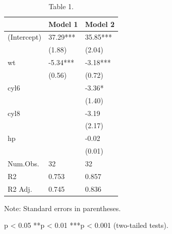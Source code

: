 \begin{table}[!t]
\centering
\caption{Table 1.}
\begin{threeparttable}
\begin{tabular}{lll}
\toprule
\rowcolor[gray]{0.92}
& Model 1 & Model 2 \\ \midrule
(Intercept) & 37.29*** & 35.85*** \\
& (1.88) & (2.04) \\
wt & -5.34*** & -3.18*** \\
& (0.56) & (0.72) \\
cyl6 &  & -3.36* \\
&  & (1.40) \\
cyl8 &  & -3.19 \\
&  & (2.17) \\
hp &  & -0.02 \\
&  & (0.01) \\
Num.Obs. & 32 & 32 \\
R2 & 0.753 & 0.857 \\
R2 Adj. & 0.745 & 0.836 \\
\bottomrule
\end{tabular}
\begin{tablenotes}[flushleft]\footnotesize
\item Note: Standard errors in parentheses.
\item *p < 0.05  **p < 0.01  ***p < 0.001 (two-tailed tests).
\end{tablenotes}
\end{threeparttable}
\end{table}

